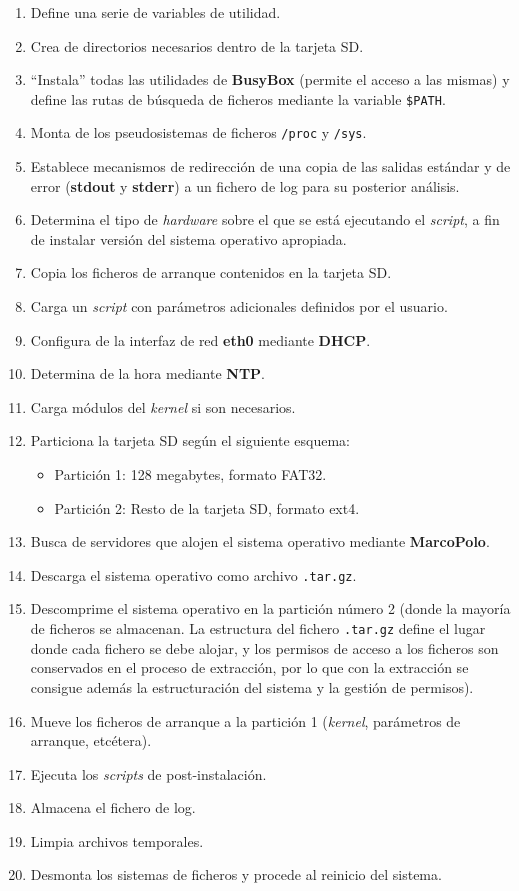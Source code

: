 \documentclass{article}
\begin{document}
\begin{enumerate}
	\item Define una serie de variables de utilidad.
	\item Crea de directorios necesarios dentro de la tarjeta SD.
	\item ``Instala'' todas las utilidades de \textbf{BusyBox} (permite el acceso a las mismas) y define las rutas de búsqueda de ficheros mediante la variable \texttt{\$PATH}.
	\item Monta de los pseudosistemas de ficheros \texttt{/proc} y \texttt{/sys}.
	\item Establece mecanismos de redirección de una copia de las salidas estándar y de error (\textbf{stdout} y \textbf{stderr}) a un fichero de log para su posterior análisis.
	\item Determina el tipo de \textit{hardware} sobre el que se está ejecutando el \textit{script}, a fin de instalar versión del sistema operativo apropiada.
	\item Copia los ficheros de arranque contenidos en la tarjeta SD.
	\item Carga un \textit{script} con parámetros adicionales definidos por el usuario.
	\item Configura de la interfaz de red \textbf{eth0} mediante \textbf{DHCP}.
	\item Determina de la hora mediante \textbf{NTP}.
	\item Carga módulos del \textit{kernel} si son necesarios.
	\item Particiona la tarjeta SD según el siguiente esquema:
	\begin{itemize}
		\item Partición 1: 128 megabytes, formato FAT32.
		\item Partición 2: Resto de la tarjeta SD, formato ext4.
	\end{itemize}
	\item Busca de servidores que alojen el sistema operativo mediante \textbf{MarcoPolo}.
	\item Descarga el sistema operativo como archivo \texttt{.tar.gz}.
	\item Descomprime el sistema operativo en la partición número 2 (donde la mayoría de ficheros se almacenan. La estructura del fichero \texttt{.tar.gz} define el lugar donde cada fichero se debe alojar, y los permisos de acceso a los ficheros son conservados en el proceso de extracción, por lo que con la extracción se consigue además la estructuración del sistema y la gestión de permisos).
	\item Mueve los ficheros de arranque a la partición 1 (\textit{kernel}, parámetros de arranque, etcétera).
	\item Ejecuta los \textit{scripts} de post-instalación.
	\item Almacena el fichero de log.
	\item Limpia archivos temporales.
	\item Desmonta los sistemas de ficheros y procede al reinicio del sistema.
\end{enumerate}
\end{document}
